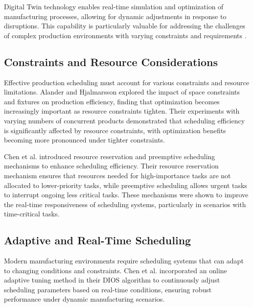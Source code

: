 Digital Twin technology enables real-time simulation and optimization of manufacturing processes, allowing for dynamic adjustments in response to disruptions. This capability is particularly valuable for addressing the challenges of complex production environments with varying constraints and requirements \cite{serranoruiz2023}.

\subsection{Constraints and Resource Considerations}

Effective production scheduling must account for various constraints and resource limitations. Alander and Hjalmarsson \cite{alander2024} explored the impact of space constraints and fixtures on production efficiency, finding that optimization becomes increasingly important as resource constraints tighten. Their experiments with varying numbers of concurrent products demonstrated that scheduling efficiency is significantly affected by resource constraints, with optimization benefits becoming more pronounced under tighter constraints.

Chen et al. \cite{chen2023} introduced resource reservation and preemptive scheduling mechanisms to enhance scheduling efficiency. Their resource reservation mechanism ensures that resources needed for high-importance tasks are not allocated to lower-priority tasks, while preemptive scheduling allows urgent tasks to interrupt ongoing less critical tasks. These mechanisms were shown to improve the real-time responsiveness of scheduling systems, particularly in scenarios with time-critical tasks.

\subsection{Adaptive and Real-Time Scheduling}

Modern manufacturing environments require scheduling systems that can adapt to changing conditions and constraints. Chen et al. \cite{chen2023} incorporated an online adaptive tuning method in their DIOS algorithm to continuously adjust scheduling parameters based on real-time conditions, ensuring robust performance under dynamic manufacturing scenarios.